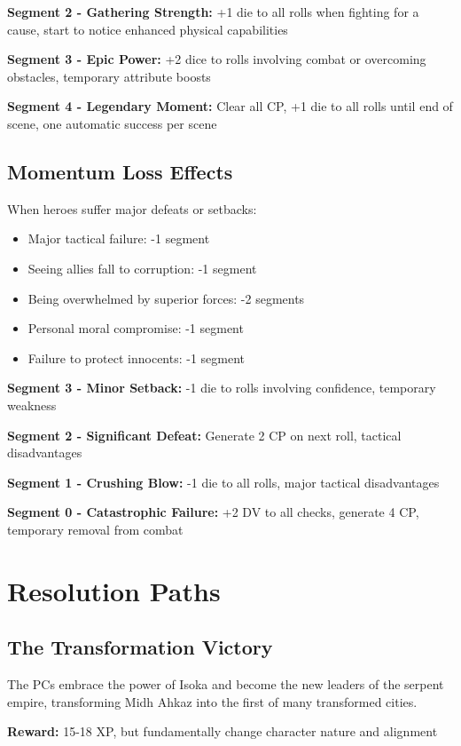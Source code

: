 \documentclass[12pt,twoside]{article}
\begin{document}
\textbf{Segment 2 - Gathering Strength:} +1 die to all rolls when fighting for a cause, start to notice enhanced physical capabilities

\textbf{Segment 3 - Epic Power:} +2 dice to rolls involving combat or overcoming obstacles, temporary attribute boosts

\textbf{Segment 4 - Legendary Moment:} Clear all CP, +1 die to all rolls until end of scene, one automatic success per scene

\subsection{Momentum Loss Effects}

When heroes suffer major defeats or setbacks:
\begin{itemize}
  \item Major tactical failure: -1 segment
  \item Seeing allies fall to corruption: -1 segment
  \item Being overwhelmed by superior forces: -2 segments
  \item Personal moral compromise: -1 segment
  \item Failure to protect innocents: -1 segment
\end{itemize}

\textbf{Segment 3 - Minor Setback:} -1 die to rolls involving confidence, temporary weakness

\textbf{Segment 2 - Significant Defeat:} Generate 2 CP on next roll, tactical disadvantages

\textbf{Segment 1 - Crushing Blow:} -1 die to all rolls, major tactical disadvantages

\textbf{Segment 0 - Catastrophic Failure:} +2 DV to all checks, generate 4 CP, temporary removal from combat

\section{Resolution Paths}

\subsection{The Transformation Victory}

The PCs embrace the power of Isoka and become the new leaders of the serpent empire, transforming Midh Ahkaz into the first of many transformed cities.

\textbf{Reward:} 15-18 XP, but fundamentally change character nature and alignment
\end{document}
